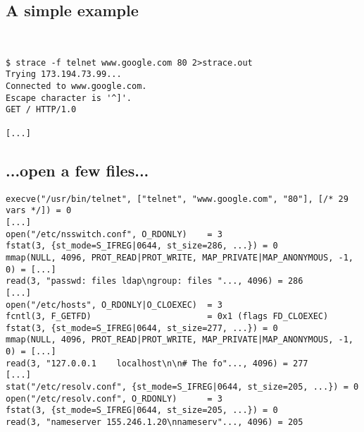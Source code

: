 \documentclass[xga]{xdvislides}
\begin{document}
\subsection{A simple example}
\\
\Hugesize
\begin{center}
\begin{verbatim}
$ strace -f telnet www.google.com 80 2>strace.out
Trying 173.194.73.99...
Connected to www.google.com.
Escape character is '^]'.
GET / HTTP/1.0

[...]
\end{verbatim}
\end{center}
\Normalsize
\vspace*{\fill}

%

\subsection{...open a few files...}
\begin{verbatim}
execve("/usr/bin/telnet", ["telnet", "www.google.com", "80"], [/* 29 vars */]) = 0
[...]
open("/etc/nsswitch.conf", O_RDONLY)    = 3
fstat(3, {st_mode=S_IFREG|0644, st_size=286, ...}) = 0
mmap(NULL, 4096, PROT_READ|PROT_WRITE, MAP_PRIVATE|MAP_ANONYMOUS, -1, 0) = [...]
read(3, "passwd: files ldap\ngroup: files "..., 4096) = 286
[...]
open("/etc/hosts", O_RDONLY|O_CLOEXEC)  = 3
fcntl(3, F_GETFD)                       = 0x1 (flags FD_CLOEXEC)
fstat(3, {st_mode=S_IFREG|0644, st_size=277, ...}) = 0
mmap(NULL, 4096, PROT_READ|PROT_WRITE, MAP_PRIVATE|MAP_ANONYMOUS, -1, 0) = [...]
read(3, "127.0.0.1    localhost\n\n# The fo"..., 4096) = 277
[...]
stat("/etc/resolv.conf", {st_mode=S_IFREG|0644, st_size=205, ...}) = 0
open("/etc/resolv.conf", O_RDONLY)      = 3
fstat(3, {st_mode=S_IFREG|0644, st_size=205, ...}) = 0
read(3, "nameserver 155.246.1.20\nnameserv"..., 4096) = 205
\end{verbatim}
\end{document}
